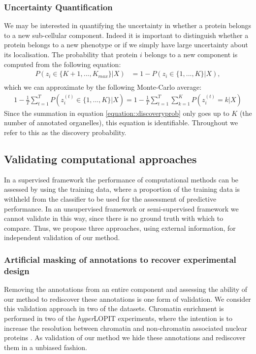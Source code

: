 \documentclass[12pt,english]{article}
\begin{document}
\subsubsection{Uncertainty Quantification}
We may be interested in quantifying the uncertainty in whether a protein belongs to a new sub-cellular component. Indeed it is important to distinguish whether a protein belongs to a new phenotype or if we simply have large uncertainty about its localisation. The probability that protein $i$ belongs to a new component is computed from the following equation:
\begin{align}
P(z_i \in \{K + 1,..., K_{max}\}|X) & = 1 - P(z_i \in \{1,..., K\}|X), \\ 
\end{align}
which we can approximate by the following Monte-Carlo average:
\begin{align}\label{equation::discoveryprob}
1 - \frac{1}{T} \sum_{t = 1}^{T}P(z^{(t)}_i \in \{1,..., K\}|X)= 1 - \frac{1}{T} \sum_{t = 1}^{T} \sum_{k=1}^KP(z^{(t)}_i = k|X)
\end{align}
Since the summation in equation \ref{equation::discoveryprob} only goes up to $K$ (the number of annotated organelles), this equation is identifiable. Throughout we refer to this as the discovery probability.
\subsection{Validating computational approaches}
In a supervised framework the performance of computational methods can be assessed by 
using the training data, where a proportion of the training data is withheld from the classifier to be used for the assessment of predictive performance. In an unsupervised framework or semi-supervised framework we cannot validate in this way, since there is no ground truth with which to compare. Thus, we propose three approaches, using external information, for independent validation of our method.
\subsubsection{Artificial masking of annotations to recover experimental design}
Removing the annotations from an entire component and assessing the ability of our method to rediscover these annotations is one form of validation. We consider this validation approach in two of the datasets. Chromatin enrichment is performed in two of the \textit{hyper}LOPIT experiments, where the intention is to increase the resolution between chromatin and non-chromatin associated nuclear proteins \citep{Mulvey:2017}. As validation of our method we hide these annotations and rediscover them in a unbiased fashion.
\end{document}
